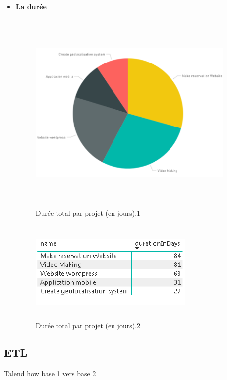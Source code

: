 \begin{itemize}
\item{ \textbf{La dur\'{e}e}  }
\FloatBarrier
\begin{figure}[H]
\center
\includegraphics[width=10cm,height=10cm]{./figures/rpb4.png}
\caption{Dur\'{e}e total par projet (en jours).1}

\end{figure}
\FloatBarrier

\FloatBarrier
\begin{figure}[H]
\center
\includegraphics[width=8cm,height=5cm]{./figures/rpb42.png}
\caption{Dur\'{e}e total par projet (en jours).2}

\end{figure}
\FloatBarrier


\end{itemize}



\subsection{ETL}

Talend how
base 1 vers base 2
